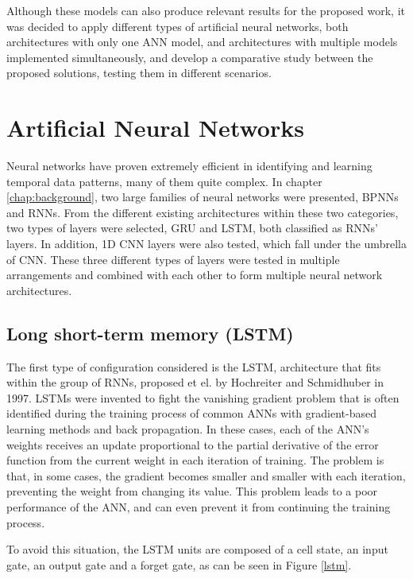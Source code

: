 Although these models can also produce relevant results for the proposed work, it was decided to apply different types of artificial neural networks, both architectures with only one \ac{ANN} model, and architectures with multiple models implemented simultaneously, and develop a comparative study between the proposed solutions, testing them in different scenarios.



\section{Artificial Neural Networks}\label{sec:layers}

Neural networks have proven extremely efficient in identifying and learning temporal data patterns, many of them quite complex. In chapter \ref{chap:background}, two large families of neural networks were presented, \ac{BPNN}s and \ac{RNN}s. From the different existing architectures within these two categories, two types of layers were selected, \ac{GRU} and \ac{LSTM}, both classified as \ac{RNN}s' layers. In addition, \ac{1D CNN} layers were also tested, which fall under the umbrella of \ac{CNN}. These three different types of layers were tested in multiple arrangements and combined with each other to form multiple neural network architectures.


\subsection{Long short-term memory (LSTM)}

The first type of configuration considered is the \ac{LSTM}, architecture that fits within the group of \ac{RNN}s, proposed et el. \cite{lstm0} by Hochreiter and Schmidhuber in 1997.
\ac{LSTM}s were invented to fight the vanishing gradient problem that is often identified during the training process of common \ac{ANN}s with gradient-based learning methods and back propagation. In these cases, each of the \ac{ANN}'s weights receives an update proportional to the partial derivative of the error function from the current weight in each iteration of training. The problem is that, in some cases, the gradient becomes smaller and smaller with each iteration, preventing the weight from changing its value. This problem leads to a poor performance of the \ac{ANN}, and can even prevent it from continuing the training process.

To avoid this situation, the \ac{LSTM} units are composed of a cell state, an input gate, an output gate and a forget gate, as can be seen in Figure \ref{lstm}.

